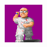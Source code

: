 \documentclass[book.tex]{subfiles}
\begin{document}
      \begin{minipage}{.48\textwidth}
     \includegraphics[width=\textwidth]{imgs/sprites/schabbs.png}
  \end{minipage}
\end{document}
